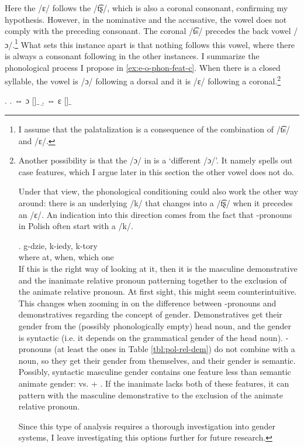 Here the /ɛ/ follows the /t͡ʂ/, which is also a coronal consonant, confirming my hypothesis. However, in the nominative and the accusative, the vowel does not comply with the preceding consonant. The coronal /t͡s/ precedes the back vowel /ɔ/.\footnote{
I assume that the palatalization is a consequence of the combination of /t͡s/ and /ɛ/.
}
What sets this instance apart is that nothing follows this vowel, where there is always a consonant following in the other instances. I summarize the phonological process I propose in \ref{ex:e-o-phon-feat-c}. When there is a closed syllable, the vowel is /ɔ/ following a dorsal and it is /ɛ/ following a coronal.\footnote{
Another possibility is that the /ɔ/ in  is a `different /ɔ/'. It namely spells out case features, which I argue later in this section the other vowel does not do.

Under that view, the phonological conditioning could also work the other way around: there is an underlying /k/ that changes into a /t͡ʂ/ when it precedes an /ɛ/. An indication into this direction comes from the fact that -pronouns in Polish often start with a /k/.

\exg. g-dzie, k-iedy, k-tory\\
{where at}, when, which one\\

If this is the right way of looking at it, then it is the masculine demonstrative and the inanimate relative pronoun patterning together to the exclusion of the animate relative pronoun. At first sight, this might seem counterintuitive. This changes when zooming in on the difference between -pronouns and demonstratives regarding the concept of gender. Demonstratives get their gender from the (possibly phonologically empty) head noun, and the gender is syntactic (i.e. it depends on the grammatical gender of the head noun). -pronouns (at least the ones in Table \ref{tbl:pol-rel-dem}) do not combine with a noun, so they get their gender from themselves, and their gender is semantic. Possibly, syntactic masculine gender contains one feature less than semantic animate gender:  vs.  + . If the inanimate lacks both of these features, it can pattern with the masculine demonstrative to the exclusion of the animate relative pronoun.

Since this type of analysis requires a thorough investigation into gender systems, I leave investigating this options further for future research.
}

\ex.\label{ex:e-o-phon-feat-c}
\a.  ⇔ ɔ []$\_$
\b.  ⇔ ɛ []$\_$


